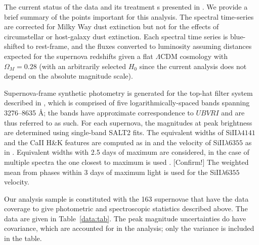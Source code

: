 \documentclass{aastex}   	%
\begin{document}
The current status of the data and its treatment s presented in \citet{2015ApJ...815...58F}.
We provide a brief summary of the points important for this analysis.
The spectral time-series  are corrected for Milky Way dust
extinction \citep{1989ApJ...345..245C,1998ApJ...500..525S} but not for the
effects of circumstellar or host-galaxy dust extinction.  
Each spectral time series is
blue-shifted to rest-frame, and the fluxes converted to luminosity assuming
distances expected for the supernova redshifts given a flat
$\Lambda$CDM cosmology with $\Omega_M = 0.28$ (with an arbitrarily selected
$H_0$ since the current analysis does not depend on the absolute magnitude scale).

Supernova-frame synthetic photometry is generated for the top-hat filter system
described in \citet{2011A&A...529L...4C}, which is comprised of five logarithmically-spaced bands spanning
3276--8635 \AA; the bands have approximate correspondence to $UBVRI$ and are thus referred to as such.
For each supernova, the magnitudes at peak brightness are determined using single-band SALT2 fits.
The equivalent widths of SiII$\lambda 4141$ and the CaII H\&K features are computed as
in \citet{2008A&A...477..717B} and the velocity of SiII$\lambda 6355$ as in \citet{chotard:thesis}.
Equivalent widths with 2.5 days of maximum are considered, in the case of multiple spectra the one
closest to maximum is used \citep{chotard:thesis}. [Confirm!]
The weighted mean from phases within 3 days of maximum light is used for the  SiII$\lambda 6355$ velocity.

Our analysis sample is constituted with the  163 supernovae that have the data coverage to 
give photometric and spectroscopic statistics described above.
The data are given in Table~\ref{data:tab}.
The peak magnitude uncertainties do have covariance, which are accounted
for in the analysis; only the variance is included in the table.
\end{document}
